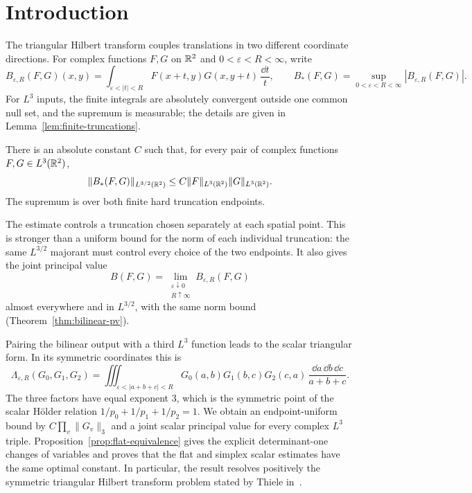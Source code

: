 \section{Introduction}\label{sec:introduction}

The triangular Hilbert transform couples translations in two different
coordinate directions. For complex functions $F,G$ on $\mathbb R^2$ and
$0<\varepsilon<R<\infty$, write
\[
 B_{\varepsilon,R}(F,G)(x,y)
 =\int_{\varepsilon<|t|<R}F(x+t,y)G(x,y+t)\,\frac{\dd t}{t},
 \qquad
 B_*(F,G)=\sup_{0<\varepsilon<R<\infty}|B_{\varepsilon,R}(F,G)|.
\]
For $L^3$ inputs, the finite integrals are absolutely convergent outside
one common null set, and the supremum is measurable; the details are
given in Lemma~\ref{lem:finite-truncations}.

\begin{theorem}\label{thm:main}
There is an absolute constant $C$ such that, for every pair of complex
functions $F,G\in L^3(\mathbb R^2)$,
\[
 \|B_*(F,G)\|_{L^{3/2}(\mathbb R^2)}
 \le C\|F\|_{L^3(\mathbb R^2)}\|G\|_{L^3(\mathbb R^2)}.
\]
The supremum is over both finite hard truncation endpoints.
\end{theorem}

The estimate controls a truncation chosen separately at each spatial
point. This is stronger than a uniform bound for the norm of each
individual truncation: the same $L^{3/2}$ majorant must control every
choice of the two endpoints. It also gives the joint principal value
\[
 B(F,G)=\lim_{\substack{\varepsilon\downarrow0\\R\uparrow\infty}}
 B_{\varepsilon,R}(F,G)
\]
almost everywhere and in $L^{3/2}$, with the same norm bound
(Theorem~\ref{thm:bilinear-pv}).

Pairing the bilinear output with a third $L^3$ function leads to the
scalar triangular form. In its symmetric coordinates this is
\[
 \Lambda_{\varepsilon,R}(G_0,G_1,G_2)
 =\iiint_{\varepsilon<|a+b+c|<R}
 G_0(a,b)G_1(b,c)G_2(c,a)
 \,\frac{\dd a\,\dd b\,\dd c}{a+b+c}.
\]
The three factors have equal exponent $3$, which is the symmetric point
of the scalar H\"older relation $1/p_0+1/p_1+1/p_2=1$.
We obtain an endpoint-uniform bound by $C\prod_v\|G_v\|_3$ and a
joint scalar principal value for every complex $L^3$ triple.
Proposition~\ref{prop:flat-equivalence} gives the explicit
determinant-one changes of variables and proves that the flat and
simplex scalar estimates have the same optimal constant.
In particular, the result resolves positively the symmetric triangular
Hilbert transform problem stated by Thiele
in~\cite[Section~9, Problem~13]{GrafakosEtAl2017}.

